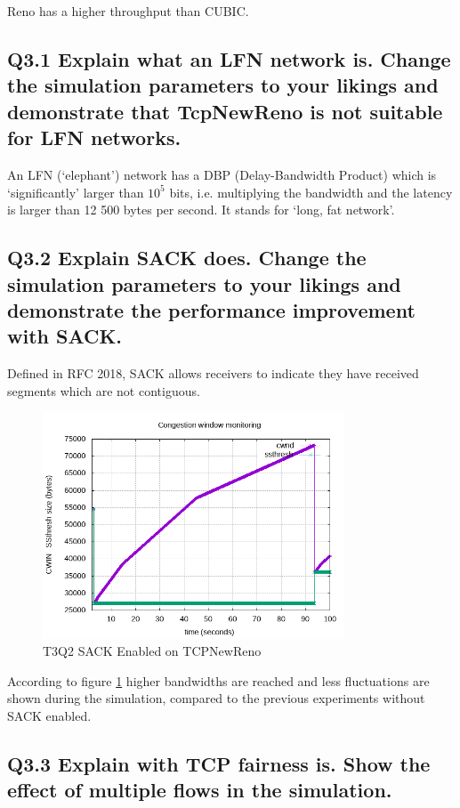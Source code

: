 \documentclass{article}
\begin{document}
Reno has a higher throughput than CUBIC.


\subsection{Q3.1 Explain what an LFN network is. Change the simulation parameters to your likings and demonstrate that TcpNewReno is not suitable for LFN networks.}

An LFN (`elephant') network has a DBP (Delay-Bandwidth Product) which is
`significantly' larger than $10^{5}$ bits, i.e. multiplying the bandwidth and
the latency is larger than 12 500 bytes per second. It stands for `long, fat
network'.


\subsection{Q3.2 Explain SACK does. Change the simulation parameters to your likings and demonstrate the performance improvement with SACK.}

Defined in RFC 2018, SACK allows receivers to indicate they have received segments which are not contiguous.

\begin{figure}[H]
	\includegraphics[width=0.8\textwidth]{lab1-group1-task3-question2.png}
	\caption{T3Q2 SACK Enabled on TCPNewReno}
	\label{fig:q32}
\end{figure}

According to figure \ref{fig:q32} higher bandwidths are reached and less fluctuations are shown during the simulation, compared to the previous experiments without SACK enabled.


\subsection{Q3.3 Explain with TCP fairness is. Show the effect of multiple flows in the simulation.}
\end{document}
